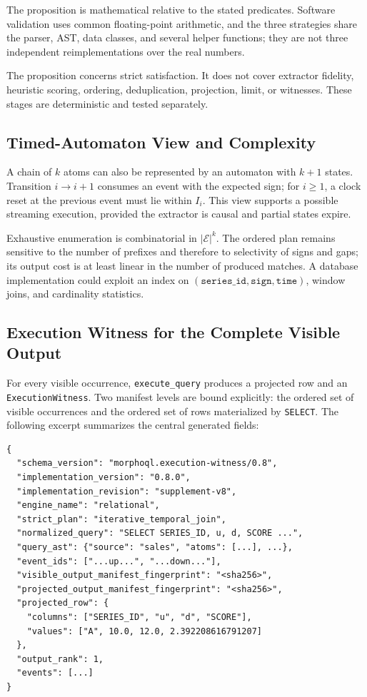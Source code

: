 \documentclass[11pt,a4paper]{article}
\newcommand{\Events}{\mathcal{E}}
\newcommand{\code}[1]{\texttt{#1}}
\begin{document}
The proposition is mathematical relative to the stated predicates. Software validation uses common floating-point arithmetic, and the three strategies share the parser, AST, data classes, and several helper functions; they are not three independent reimplementations over the real numbers.

The proposition concerns strict satisfaction. It does not cover extractor fidelity, heuristic scoring, ordering, deduplication, projection, limit, or witnesses. These stages are deterministic and tested separately.

\subsection{Timed-Automaton View and Complexity}

A chain of $k$ atoms can also be represented by an automaton with $k+1$ states. Transition $i\to i+1$ consumes an event with the expected sign; for $i\geq1$, a clock reset at the previous event must lie within $I_i$. This view supports a possible streaming execution, provided the extractor is causal and partial states expire.

Exhaustive enumeration is combinatorial in $|\Events|^k$. The ordered plan remains sensitive to the number of prefixes and therefore to selectivity of signs and gaps; its output cost is at least linear in the number of produced matches. A database implementation could exploit an index on $(\code{series\_id},\code{sign},\code{time})$, window joins, and cardinality statistics.

\subsection{Execution Witness for the Complete Visible Output}

For every visible occurrence, \code{execute\_query} produces a projected row and an \code{ExecutionWitness}. Two manifest levels are bound explicitly: the ordered set of visible occurrences and the ordered set of rows materialized by \code{SELECT}. The following excerpt summarizes the central generated fields:
\begin{lstlisting}[language={},basicstyle=\ttfamily\scriptsize]
{
  "schema_version": "morphoql.execution-witness/0.8",
  "implementation_version": "0.8.0",
  "implementation_revision": "supplement-v8",
  "engine_name": "relational",
  "strict_plan": "iterative_temporal_join",
  "normalized_query": "SELECT SERIES_ID, u, d, SCORE ...",
  "query_ast": {"source": "sales", "atoms": [...], ...},
  "event_ids": ["...up...", "...down..."],
  "visible_output_manifest_fingerprint": "<sha256>",
  "projected_output_manifest_fingerprint": "<sha256>",
  "projected_row": {
    "columns": ["SERIES_ID", "u", "d", "SCORE"],
    "values": ["A", 10.0, 12.0, 2.392208616791207]
  },
  "output_rank": 1,
  "events": [...]
}
\end{lstlisting}
\end{document}
